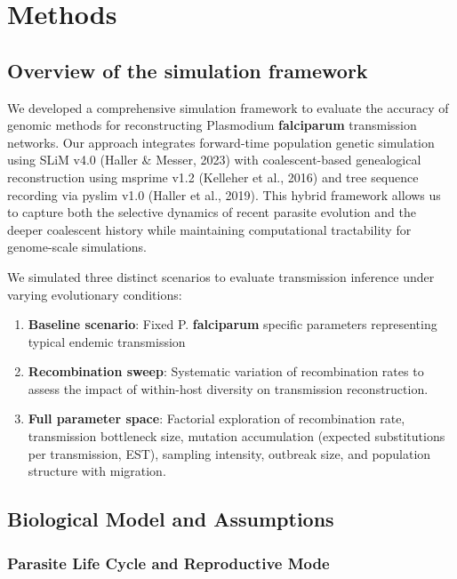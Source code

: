 \documentclass[
  11pt,
]{article}
\providecommand{\tightlist}{%
  \setlength{\itemsep}{0pt}\setlength{\parskip}{0pt}}
\begin{document}
\newpage

\section{Methods}\label{methods}

\subsection{Overview of the simulation
framework}\label{overview-of-the-simulation-framework}

We developed a comprehensive simulation framework to evaluate the
accuracy of genomic methods for reconstructing Plasmodium
\textbf{falciparum} transmission networks. Our approach integrates
forward-time population genetic simulation using SLiM v4.0 (Haller \&
Messer, 2023) with coalescent-based genealogical reconstruction using
msprime v1.2 (Kelleher et al., 2016) and tree sequence recording via
pyslim v1.0 (Haller et al., 2019). This hybrid framework allows us to
capture both the selective dynamics of recent parasite evolution and the
deeper coalescent history while maintaining computational tractability
for genome-scale simulations.

We simulated three distinct scenarios to evaluate transmission inference
under varying evolutionary conditions:

\begin{enumerate}
\def\labelenumi{\arabic{enumi}.}
\tightlist
\item
  \textbf{Baseline scenario}: Fixed P. \textbf{falciparum} specific
  parameters representing typical endemic transmission
\item
  \textbf{Recombination sweep}: Systematic variation of recombination
  rates to assess the impact of within-host diversity on transmission
  reconstruction.
\item
  \textbf{Full parameter space}: Factorial exploration of recombination
  rate, transmission bottleneck size, mutation accumulation (expected
  substitutions per transmission, EST), sampling intensity, outbreak
  size, and population structure with migration.
\end{enumerate}

\subsection{Biological Model and
Assumptions}\label{biological-model-and-assumptions}

\subsubsection{Parasite Life Cycle and Reproductive
Mode}\label{parasite-life-cycle-and-reproductive-mode}
\end{document}
